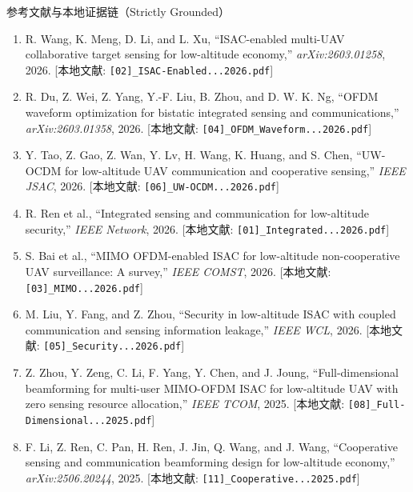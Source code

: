 \documentclass[aspectratio=169, 10pt]{ctexbeamer}
\begin{document}
\begin{frame}[allowframebreaks]{参考文献与本地证据链（Strictly Grounded）}
  \footnotesize
  \begin{enumerate}
    \item R. Wang, K. Meng, D. Li, and L. Xu, ``ISAC-enabled multi-UAV collaborative target sensing for low-altitude economy,'' \emph{arXiv:2603.01258}, 2026. [本地文献: \texttt{[02]\_ISAC-Enabled...2026.pdf}]
    \item R. Du, Z. Wei, Z. Yang, Y.-F. Liu, B. Zhou, and D. W. K. Ng, ``OFDM waveform optimization for bistatic integrated sensing and communications,'' \emph{arXiv:2603.01358}, 2026. [本地文献: \texttt{[04]\_OFDM\_Waveform...2026.pdf}]
    \item Y. Tao, Z. Gao, Z. Wan, Y. Lv, H. Wang, K. Huang, and S. Chen, ``UW-OCDM for low-altitude UAV communication and cooperative sensing,'' \emph{IEEE JSAC}, 2026. [本地文献: \texttt{[06]\_UW-OCDM...2026.pdf}]
    \item R. Ren et al., ``Integrated sensing and communication for low-altitude security,'' \emph{IEEE Network}, 2026. [本地文献: \texttt{[01]\_Integrated...2026.pdf}]
    \item S. Bai et al., ``MIMO OFDM-enabled ISAC for low-altitude non-cooperative UAV surveillance: A survey,'' \emph{IEEE COMST}, 2026. [本地文献: \texttt{[03]\_MIMO...2026.pdf}]
    \item M. Liu, Y. Fang, and Z. Zhou, ``Security in low-altitude ISAC with coupled communication and sensing information leakage,'' \emph{IEEE WCL}, 2026. [本地文献: \texttt{[05]\_Security...2026.pdf}]
    \item Z. Zhou, Y. Zeng, C. Li, F. Yang, Y. Chen, and J. Joung, ``Full-dimensional beamforming for multi-user MIMO-OFDM ISAC for low-altitude UAV with zero sensing resource allocation,'' \emph{IEEE TCOM}, 2025. [本地文献: \texttt{[08]\_Full-Dimensional...2025.pdf}]
    \item F. Li, Z. Ren, C. Pan, H. Ren, J. Jin, Q. Wang, and J. Wang, ``Cooperative sensing and communication beamforming design for low-altitude economy,'' \emph{arXiv:2506.20244}, 2025. [本地文献: \texttt{[11]\_Cooperative...2025.pdf}]
  \end{enumerate}
\end{frame}
\end{document}
